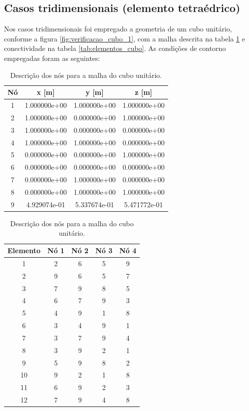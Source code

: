 \subsection{Casos tridimensionais (elemento tetraédrico)}

Nos casos tridimensionais foi empregado a geometria de um cubo unitário, conforme a figura \ref{fig:verificacao_cubo_1}, com a malha descrita na tabela \ref{tab:nos_cubo} e conectividade na tabela \ref{tab:elementos_cubo}. As condições de contorno empregadas foram as seguintes:

\begin{table}
    \centering
    \caption{Descrição dos nós para a malha do cubo unitário.}
    \begin{tabular}{c | c c c}
        \toprule
        \textbf{Nó} & \textbf{x} [m]  & \textbf{y}  [m]  & \textbf{z}  [m]  \\
        \midrule
        1 & 1.000000e+00 & 1.000000e+00 & 1.000000e+00 \\
        2 & 1.000000e+00 & 0.000000e+00 & 1.000000e+00 \\
        3 & 1.000000e+00 & 0.000000e+00 & 0.000000e+00 \\
        4 & 1.000000e+00 & 1.000000e+00 & 0.000000e+00 \\
        5 & 0.000000e+00 & 0.000000e+00 & 1.000000e+00 \\
        6 & 0.000000e+00 & 0.000000e+00 & 0.000000e+00 \\
        7 & 0.000000e+00 & 1.000000e+00 & 0.000000e+00 \\
        8 & 0.000000e+00 & 1.000000e+00 & 1.000000e+00 \\
        9 & 4.929074e-01 & 5.337674e-01 & 5.471772e-01 \\
        \bottomrule
    \end{tabular}
    \label{tab:nos_cubo}
\end{table}

\begin{table}
    \centering
    \caption{Descrição dos nós para a malha do cubo unitário.}
    \begin{tabular}{c | c c c c}
        \toprule
        \textbf{Elemento} & \textbf{Nó 1} & \textbf{Nó 2} & \textbf{Nó 3}  & \textbf{Nó 4} \\
        \midrule
        1 & 2 & 6 & 5 & 9 \\
        2 & 9 & 6 & 5 & 7 \\
        3 & 7 & 9 & 8 & 5 \\
        4 & 6 & 7 & 9 & 3 \\
        5 & 4 & 9 & 1 & 8 \\
        6 & 3 & 4 & 9 & 1 \\
        7 & 3 & 7 & 9 & 4 \\
        8 & 3 & 9 & 2 & 1 \\
        9 & 5 & 9 & 8 & 2 \\
        10 & 9 & 2 & 1 & 8 \\
        11 & 6 & 9 & 2 & 3 \\
        12 & 7 & 9 & 4 & 8 \\
        \bottomrule
    \end{tabular}
\end{table}

